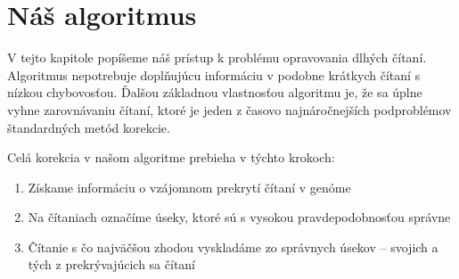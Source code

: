 \chapter{Náš algoritmus}

V tejto kapitole popíšeme náš prístup k problému opravovania dlhých čítaní. Algoritmus nepotrebuje doplňujúcu informáciu v podobne krátkych čítaní s nízkou chybovosťou. Ďalšou základnou vlastnosťou algoritmu je, že sa úplne vyhne zarovnávaniu čítaní, ktoré je jeden z časovo najnáročnejších podproblémov štandardných metód korekcie. 

Celá korekcia v našom algoritme prebieha v týchto krokoch:
\begin{enumerate}
\item Získame informáciu o vzájomnom prekrytí čítaní v genóme
\item Na čítaniach označíme úseky, ktoré sú s vysokou pravdepodobnosťou správne
\item Čítanie s čo najväčšou zhodou vyskladáme zo správnych úsekov -- svojich a tých z prekrývajúcich sa čítaní
\end{enumerate}





